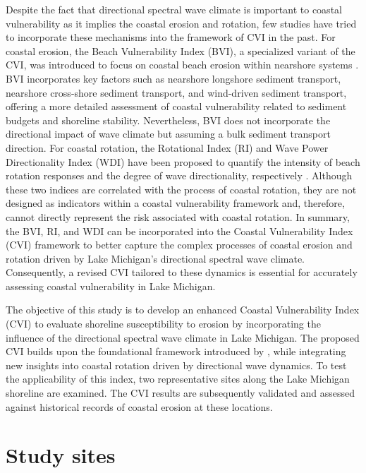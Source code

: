 Despite the fact that directional spectral wave climate is important to coastal
vulnerability as it implies the coastal erosion and rotation, few studies have
tried to incorporate these mechanisms into the framework of CVI in the past. For
coastal erosion, the Beach Vulnerability Index (BVI), a specialized variant of
the CVI, was introduced to focus on coastal beach erosion within nearshore
systems \citep{alexandrakis_holistic_2014}. BVI incorporates key factors such as
nearshore longshore sediment transport, nearshore cross-shore sediment
transport, and wind-driven sediment transport, offering a more detailed
assessment of coastal vulnerability related to sediment budgets and shoreline
stability. Nevertheless, BVI does not incorporate the directional impact of wave
climate but assuming a bulk sediment transport direction. For coastal rotation,
the Rotational Index (RI) and Wave Power Directionality Index (WDI) have been
proposed to quantify the intensity of beach rotation responses and the degree of
wave directionality, respectively
\citep{wiggins_coastal_2019,wiggins_regionally-coherent_2019}. Although these
two indices are correlated with the process of coastal rotation, they are not
designed as indicators within a coastal vulnerability framework and, therefore,
cannot directly represent the risk associated with coastal rotation. In summary,
the BVI, RI, and WDI can be incorporated into the Coastal Vulnerability Index
(CVI) framework to better capture the complex processes of coastal erosion and
rotation driven by Lake Michigan's directional spectral wave climate.
Consequently, a revised CVI tailored to these dynamics is essential for
accurately assessing coastal vulnerability in Lake Michigan.

The objective of this study is to develop an enhanced Coastal Vulnerability Index
(CVI) to evaluate shoreline susceptibility to erosion by incorporating the
influence of the directional spectral wave climate in Lake Michigan. The
proposed CVI builds upon the foundational framework introduced by
\citet{gornitz_global_1991}, while integrating new insights into coastal
rotation driven by directional wave dynamics. To test the applicability of this
index, two representative sites along the Lake Michigan shoreline are examined.
The CVI results are subsequently validated and assessed against historical
records of coastal erosion at these locations.

\section{Study sites}
\label{c5_Study sites}

